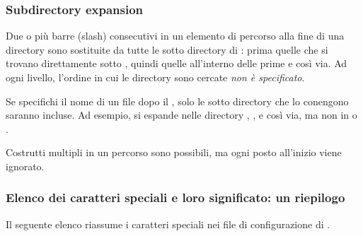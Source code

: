 \documentclass{article}
\begin{document}
\subsubsection{Subdirectory expansion}
\label{sec:subdirectory-expansion}

Due o più barre (slash) consecutivi in un elemento di percorso alla fine
di una directory  sono sostituite da tutte le sotto directory di
: prima quelle che si trovano direttamente sotto , quindi
quelle all'interno delle prime e così via. Ad ogni livello, l'ordine in
cui le directory sono cercate \emph{non è specificato}.

Se specifichi il nome di un file dopo il \samp{//}, solo le sotto
directory che lo conengono saranno incluse. Ad esempio,  si
espande nelle directory , ,  e
così via, ma non in  o .

Costrutti \samp{//} multipli in un percorso sono possibili, ma ogni
\samp{//} posto all'inizio viene ignorato.

\subsubsection{Elenco dei caratteri speciali e loro significato: un
  riepilogo}

Il seguente elenco riassume i caratteri speciali nei file di
configurazione di \KPS{}.
\end{document}
